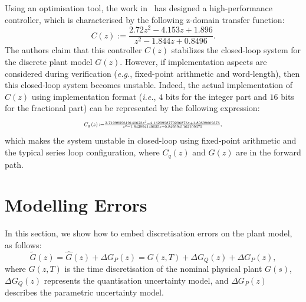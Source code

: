 \documentclass{sig-alternate-05-2015}
\begin{document}
Using an optimisation tool, the work in~\cite{DBLP:conf/hybrid/WangGRJF16} has designed 
a high-performance controller, which is characterised by the following z-domain transfer function:
\begin{equation}
\label{Eq:running-example-controller}
C\left(z\right) := \frac{2.72z^2 - 4.153z + 1.896}{z^2 - 1.844z + 0.8496}.
\end{equation}
The authors claim that this controller $C(z)$ stabilizes the closed-loop system for the discrete plant model $G(z)$.  
However, if implementation aspects are considered during verification ({\it e.g.}, fixed-point arithmetic 
and word-length), then this closed-loop system becomes unstable.
%
Indeed, the actual implementation of $C(z)$ using  implementation format 
({\it i.e.}, $4$ bits for the integer part and $16$ bits for the fractional part)
can be represented by the following expression: 
\begin{equation}
\label{Eq:running-example-controller-quantized}
\resizebox{0.5\textwidth}{!}{
$C_{q}\left(z\right) {:=} \frac{2.7199859619140625z^2{-}4.1529998779296875z
{+}1.89599609375}{z^2{-}1.843994140625z+0.8495941162109375},$
}
\end{equation} 
which makes the system unstable in closed-loop using fixed-point arithmetic and 
the typical series loop configuration, where $C_{q}\left(z\right)$ and $G\left(z\right)$ 
are in the forward path.



\section{Modelling Errors} 

In this section, we show how to embed discretisation errors on the plant model, as follows: 
%
\begin{equation}
\label{eq:uncertainplant}
\tilde G(z) = \hat G(z) + \Delta G_P(z) = G(z,T) + \Delta G_Q(z) + \Delta G_P(z),   
\end{equation}
where $G(z,T)$ is the time discretisation of the nominal physical plant $G(s)$, 
$\Delta{G_{Q}(z)}$ represents the quantisation uncertainty model, 
and $\Delta{G_{P}(z)}$ describes the parametric uncertainty model. 

\end{document}
